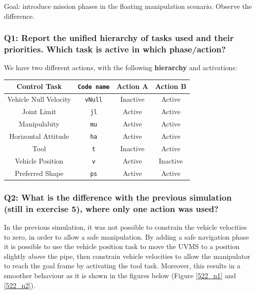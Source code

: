 \documentclass{article}
\begin{document}
Goal: introduce mission phases in the floating manipulation scenario. Observe the difference.

\subsubsection{Q1: Report the unified hierarchy of tasks used and their priorities. Which task is active in which phase/action?}
We have two different actions, with the following \textbf{hierarchy} and activations:
\begin{center}
\begin{tabular}{ | c | c | c | c |}
\hline
 Control Task & \texttt{Code name} & Action A & Action B \\
 \hline
 Vehicle Null Velocity & \texttt{vNull} & Inactive & Active \\
 Joint Limit & \texttt{jl} & Active & Active \\
 Manipulabity &  \texttt{mu} & Active & Active\\
 Horizontal Attitude &  \texttt{ha} & Active & Active \\
 Tool  &  \texttt{t} & Inactive & Active\\
 Vehicle Position &  \texttt{v} &Active & Inactive\\
 Preferred Shape & \texttt{ps} & Active & Active\\
 \hline
\end{tabular}
\end{center}

\subsubsection{Q2: What is the difference with the previous simulation (still in exercise 5), where only one action was used?}
In the previous simulation, it was not possible to constrain the vehicle velocities to zero, in order to allow a safe manipulation. By adding a safe navigation phase it is possible to use the vehicle position task to move the UVMS to a position slightly above the pipe, then constrain vehicle velocities to allow the manipulator to reach the goal frame by activating the tool task. Moreover, this results in a smoother behaviour as it is shown in the figures below (Figure \ref{522_n1} and \ref{522_n2}).


\end{document}

